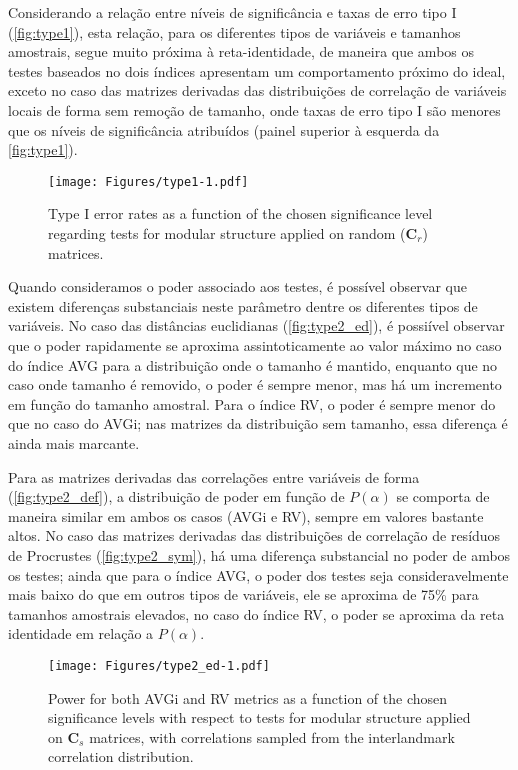 \documentclass[11pt,]{article}
\begin{document}
Considerando a relação entre níveis de significância e taxas de erro
tipo I (\autoref{fig:type1}), esta relação, para os diferentes tipos de
variáveis e tamanhos amostrais, segue muito próxima à reta-identidade,
de maneira que ambos os testes baseados no dois índices apresentam um
comportamento próximo do ideal, exceto no caso das matrizes derivadas
das distribuições de correlação de variáveis locais de forma sem remoção
de tamanho, onde taxas de erro tipo I são menores que os níveis de
significância atribuídos (painel superior à esquerda da
\autoref{fig:type1}).

\begin{figure}[htbp]
\centering
\texttt{[image: Figures/type1-1.pdf]}
\caption{Type I error rates as a function of the chosen significance
level regarding tests for modular structure applied on random
($\mathbf{C}_r$) matrices. \label{fig:type1}}
\end{figure}

Quando consideramos o poder associado aos testes, é possível observar
que existem diferenças substanciais neste parâmetro dentre os diferentes
tipos de variáveis. No caso das distâncias euclidianas
(\autoref{fig:type2_ed}), é possiível observar que o poder rapidamente
se aproxima assintoticamente ao valor máximo no caso do índice AVG para
a distribuição onde o tamanho é mantido, enquanto que no caso onde
tamanho é removido, o poder é sempre menor, mas há um incremento em
função do tamanho amostral. Para o índice RV, o poder é sempre menor do
que no caso do AVGi; nas matrizes da distribuição sem tamanho, essa
diferença é ainda mais marcante.

Para as matrizes derivadas das correlações entre variáveis de forma
(\autoref{fig:type2_def}), a distribuição de poder em função de
$P(\alpha)$ se comporta de maneira similar em ambos os casos (AVGi e
RV), sempre em valores bastante altos. No caso das matrizes derivadas
das distribuições de correlação de resíduos de Procrustes
(\autoref{fig:type2_sym}), há uma diferença substancial no poder de
ambos os testes; ainda que para o índice AVG, o poder dos testes seja
consideravelmente mais baixo do que em outros tipos de variáveis, ele se
aproxima de 75\% para tamanhos amostrais elevados, no caso do índice RV,
o poder se aproxima da reta identidade em relação a $P(\alpha)$.

\begin{figure}[htbp]
\centering
\texttt{[image: Figures/type2\_ed-1.pdf]}
\caption{Power for both AVGi and RV metrics as a function of the chosen
significance levels with respect to tests for modular structure applied
on $\mathbf{C}_s$ matrices, with correlations sampled from the
interlandmark correlation distribution. \label{fig:type2_ed}}
\end{figure}
\end{document}
